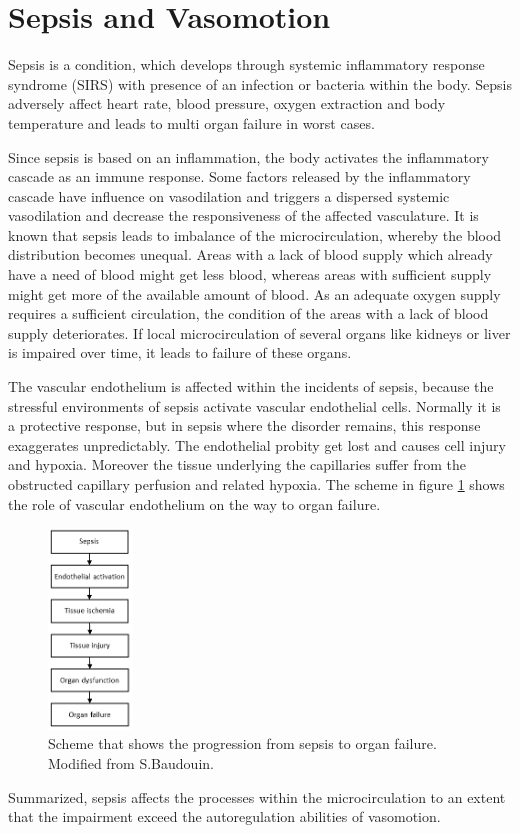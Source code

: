 
\label{chap:sepsis}
\section{Sepsis and Vasomotion}

Sepsis is a condition, which develops through systemic inflammatory response syndrome (SIRS) with presence of an infection or bacteria within the body. Sepsis adversely affect heart rate, blood pressure, oxygen extraction and body temperature and leads to multi organ failure in worst cases.\cite{pluta2010,kanta2014}

Since sepsis is based on an inflammation, the body activates the inflammatory cascade as an immune response. Some factors released by the inflammatory cascade have influence on vasodilation and triggers a dispersed systemic vasodilation and decrease the responsiveness of the affected vasculature. It is known that sepsis leads to imbalance of the microcirculation, whereby the blood distribution becomes unequal. Areas with a lack of blood supply which already have a need of blood might get less blood, whereas areas with sufficient supply might get more of the available amount of blood. As an adequate oxygen supply requires a sufficient circulation, the condition of the areas with a lack of blood supply deteriorates.
If local microcirculation of several organs like kidneys or liver is impaired over time, it leads to failure of these organs.\cite{baudouin2008,kanta2014}

The vascular endothelium is affected within the incidents of sepsis, because the stressful environments of sepsis activate vascular endothelial cells. Normally it is a protective response, but in sepsis where the disorder remains, this response exaggerates unpredictably. The endothelial probity get lost and causes cell injury and hypoxia. Moreover the tissue underlying the capillaries suffer from the obstructed capillary perfusion and related hypoxia. The scheme in figure \ref{fig:Sepsis} shows the role of vascular endothelium on the way to organ failure.\cite{baudouin2008}

\begin{figure}[H]
	\centering	\includegraphics[width=0.2\textwidth]{figures/SepsisEndo}
	\caption{Scheme that shows the progression from sepsis to organ failure. Modified from S.Baudouin.\cite{baudouin2008}}
	\label{fig:Sepsis}
\end{figure}

Summarized, sepsis affects the processes within the microcirculation to an extent that the impairment exceed the autoregulation abilities of vasomotion.